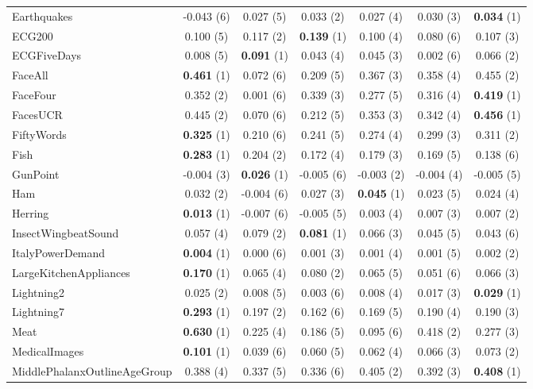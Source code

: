 \begin{table}[ht]
\begin{adjustbox}{width=\textwidth}
\begin{tabular}{lcccccc}
    Earthquakes & -0.043 (6) & 0.027 (5) & 0.033 (2) & 0.027 (4) & 0.030 (3) & \textbf{0.034} (1) \\
    ECG200 & 0.100 (5) & 0.117 (2) & \textbf{0.139} (1) & 0.100 (4) & 0.080 (6) & 0.107 (3) \\
    ECGFiveDays & 0.008 (5) & \textbf{0.091} (1) & 0.043 (4) & 0.045 (3) & 0.002 (6) & 0.066 (2) \\
    FaceAll & \textbf{0.461} (1) & 0.072 (6) & 0.209 (5) & 0.367 (3) & 0.358 (4) & 0.455 (2) \\
    FaceFour & 0.352 (2) & 0.001 (6) & 0.339 (3) & 0.277 (5) & 0.316 (4) & \textbf{0.419} (1) \\
    FacesUCR & 0.445 (2) & 0.070 (6) & 0.212 (5) & 0.353 (3) & 0.342 (4) & \textbf{0.456} (1) \\
    FiftyWords & \textbf{0.325} (1) & 0.210 (6) & 0.241 (5) & 0.274 (4) & 0.299 (3) & 0.311 (2) \\
    Fish & \textbf{0.283} (1) & 0.204 (2) & 0.172 (4) & 0.179 (3) & 0.169 (5) & 0.138 (6) \\
    GunPoint & -0.004 (3) & \textbf{0.026} (1) & -0.005 (6) & -0.003 (2) & -0.004 (4) & -0.005 (5) \\
    Ham & 0.032 (2) & -0.004 (6) & 0.027 (3) & \textbf{0.045} (1) & 0.023 (5) & 0.024 (4) \\
    Herring & \textbf{0.013} (1) & -0.007 (6) & -0.005 (5) & 0.003 (4) & 0.007 (3) & 0.007 (2) \\
    InsectWingbeatSound & 0.057 (4) & 0.079 (2) & \textbf{0.081} (1) & 0.066 (3) & 0.045 (5) & 0.043 (6) \\
    ItalyPowerDemand & \textbf{0.004} (1) & 0.000 (6) & 0.001 (3) & 0.001 (4) & 0.001 (5) & 0.002 (2) \\
    LargeKitchenAppliances & \textbf{0.170} (1) & 0.065 (4) & 0.080 (2) & 0.065 (5) & 0.051 (6) & 0.066 (3) \\
    Lightning2 & 0.025 (2) & 0.008 (5) & 0.003 (6) & 0.008 (4) & 0.017 (3) & \textbf{0.029} (1) \\
    Lightning7 & \textbf{0.293} (1) & 0.197 (2) & 0.162 (6) & 0.169 (5) & 0.190 (4) & 0.190 (3) \\
    Meat & \textbf{0.630} (1) & 0.225 (4) & 0.186 (5) & 0.095 (6) & 0.418 (2) & 0.277 (3) \\
    MedicalImages & \textbf{0.101} (1) & 0.039 (6) & 0.060 (5) & 0.062 (4) & 0.066 (3) & 0.073 (2) \\
    MiddlePhalanxOutlineAgeGroup & 0.388 (4) & 0.337 (5) & 0.336 (6) & 0.405 (2) & 0.392 (3) & \textbf{0.408} (1) \\

\end{tabular}
\end{adjustbox}
\end{table}
